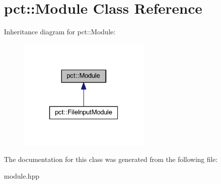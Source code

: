 \hypertarget{classpct_1_1_module}{\section{pct\-:\-:Module Class Reference}
\label{classpct_1_1_module}
}


Inheritance diagram for pct\-:\-:Module\-:\nopagebreak
\begin{figure}[H]
\begin{center}
\leavevmode
\includegraphics[width=184pt]{classpct_1_1_module__inherit__graph}
\end{center}
\end{figure}


The documentation for this class was generated from the following file\-:\begin{DoxyCompactItemize}
\item 
module.\-hpp\end{DoxyCompactItemize}
